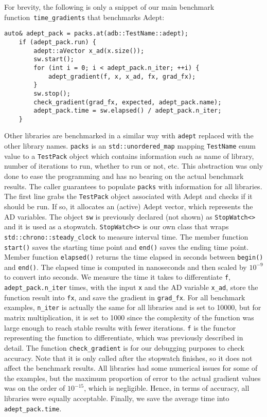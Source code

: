 For brevity, the following is only a snippet of our main
benchmark function~\verb|time_gradients| that benchmarks Adept:
\begin{lstlisting}[style=customcpp]
    auto& adept_pack = packs.at(adb::TestName::adept);
    if (adept_pack.run) {
        adept::aVector x_ad(x.size());
        sw.start();
        for (int i = 0; i < adept_pack.n_iter; ++i) {
            adept_gradient(f, x, x_ad, fx, grad_fx);
        }
        sw.stop();
        check_gradient(grad_fx, expected, adept_pack.name);
        adept_pack.time = sw.elapsed() / adept_pack.n_iter;
    }
\end{lstlisting}
Other libraries are benchmarked in a similar way with \verb|adept| replaced with the other library names.
\verb|packs| is an \verb|std::unordered_map| mapping \verb|TestName| enum value to a \verb|TestPack| object
which contains information such as name of library, number of iterations to run, whether to run or not, etc.
This abstraction was only done to ease the programming and has no bearing on the actual benchmark results.
The caller guarantees to populate \verb|packs| with information for all libraries.
The first line grabs the \verb|TestPack| object associated with Adept and checks if it should be run.
If so, it allocates an (active) Adept vector, which represents the AD variables.
The object \verb|sw| is previously declared (not shown) as \verb|StopWatch<>| and it is used as a stopwatch.
\verb|StopWatch<>| is our own class that wraps \verb|std::chrono::steady_clock| to measure interval time.
The member function \verb|start()| saves the starting time point and \verb|end()| saves the ending time point.
Member function \verb|elapsed()| returns the time elapsed in seconds between \verb|begin()| and \verb|end()|.
The elapsed time is computed in nanoseconds and then scaled by $10^{-9}$ to convert into seconds.
We measure the time it takes to differentiate \verb|f|, \verb|adept_pack.n_iter| times,
with the input \verb|x| and the AD variable \verb|x_ad|,
store the function result into \verb|fx|, and save the gradient in \verb|grad_fx|.
For all benchmark examples, \verb|n_iter| is actually the same for all libraries and is set to 10000,
but for matrix multiplication, it is set to 1000 
since the complexity of the function was large enough to reach stable results with fewer iterations.
\verb|f| is the functor representing the function to differentiate,
which was previously described in detail.
The function \verb|check_gradient| is for our debugging purposes to check accuracy.
Note that it is only called after the stopwatch finishes, so it does not affect the benchmark results.
All libraries had some numerical issues for some of the examples,
but the maximum proportion of error to the actual gradient values was on the order of $ 10^{-15}$, which is negligible.
Hence, in terms of accuracy, all libraries were equally acceptable.
Finally, we save the average time into \verb|adept_pack.time|.

